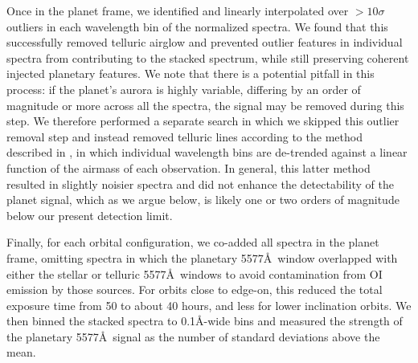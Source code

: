 \documentclass[apjl]{emulateapj}
\begin{document}
Once in the planet frame, we identified and linearly interpolated over $> 10 \sigma$ outliers in each wavelength bin of the normalized spectra. We found that this successfully removed telluric airglow and prevented outlier features in individual spectra from contributing to the stacked spectrum, while still preserving coherent injected planetary features. We note that there is a potential pitfall in this process: if the planet's aurora is highly variable, differing by an order of magnitude or more across all the spectra, the signal may be removed during this step. We therefore performed a separate search in which we skipped this outlier removal step and instead removed telluric lines according to the method described in \citet{Brogi2012}, in which individual wavelength bins are de-trended against a linear function of the airmass of each observation. In general, this latter method resulted in slightly noisier spectra and did not enhance the detectability of the planet signal, which as we argue below, is likely one or two orders of magnitude below our present detection limit.

Finally, for each orbital configuration, we co-added all spectra in the planet frame, omitting spectra in which the planetary 5577\AA\ window overlapped with either the stellar or telluric 5577\AA\ windows to avoid contamination from OI emission by those sources. For orbits close to edge-on, this reduced the total exposure time from 50 to about 40 hours, and less for lower inclination orbits. We then binned the stacked spectra to 0.1\AA-wide bins and measured the strength of the planetary 5577\AA\ signal as the number of standard deviations above the mean.
\end{document}

